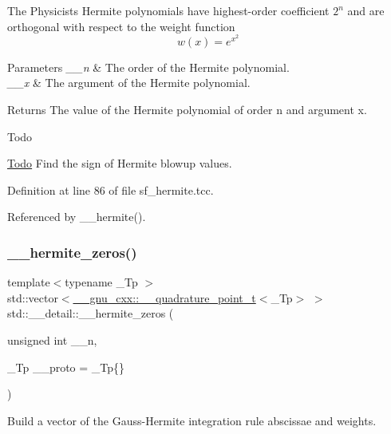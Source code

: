 The Physicists Hermite polynomials have highest-\/order coefficient $ 2^n $ and are orthogonal with respect to the weight function \[ w(x) = e^{x^2} \]


\begin{DoxyParams}{Parameters}
{\em \+\_\+\+\_\+n} & The order of the Hermite polynomial. \\
\hline
{\em \+\_\+\+\_\+x} & The argument of the Hermite polynomial. \\
\hline
\end{DoxyParams}
\begin{DoxyReturn}{Returns}
The value of the Hermite polynomial of order n and argument x. 
\end{DoxyReturn}
\begin{DoxyRefDesc}{Todo}
\item[\hyperlink{todo__todo000013}{Todo}]Find the sign of Hermite blowup values. \end{DoxyRefDesc}


Definition at line 86 of file sf\+\_\+hermite.\+tcc.



Referenced by \+\_\+\+\_\+hermite().

\mbox{\label{namespacestd_1_1____detail_a34e064cf8ddf0680ce559ba3f976c6dd}} 
\subsubsection{\texorpdfstring{\+\_\+\+\_\+hermite\+\_\+zeros()}{\_\_hermite\_zeros()}}
{\footnotesize\ttfamily template$<$typename \+\_\+\+Tp $>$ \\
std\+::vector$<$\hyperlink{struct____gnu__cxx_1_1____quadrature__point__t}{\+\_\+\+\_\+gnu\+\_\+cxx\+::\+\_\+\+\_\+quadrature\+\_\+point\+\_\+t}$<$\+\_\+\+Tp$>$ $>$ std\+::\+\_\+\+\_\+detail\+::\+\_\+\+\_\+hermite\+\_\+zeros (\begin{DoxyParamCaption}\item[{unsigned int}]{\+\_\+\+\_\+n,  }\item[{\+\_\+\+Tp}]{\+\_\+\+\_\+proto = {\ttfamily \+\_\+Tp\{\}} }\end{DoxyParamCaption})}

Build a vector of the Gauss-\/\+Hermite integration rule abscissae and weights. 

